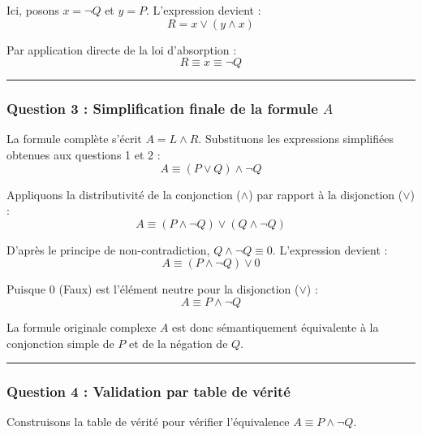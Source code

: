 \documentclass[11pt,a4paper]{article}
\begin{document}
Ici, posons \(x = \neg Q\) et \(y = P\). L'expression devient :
\[R = x \lor (y \land x)\]

Par application directe de la loi d'absorption :
\[R \equiv x \equiv \neg Q\]

\begin{center}\rule{0.5\linewidth}{0.5pt}\end{center}

\hypertarget{question-3-simplification-finale-de-la-formule-a}{%
\subsubsection{\texorpdfstring{Question 3 : Simplification finale de la
formule
\(A\)}{Question 3 : Simplification finale de la formule A}}\label{question-3-simplification-finale-de-la-formule-a}}

La formule complète s'écrit \(A = L \land R\). Substituons les
expressions simplifiées obtenues aux questions 1 et 2 :
\[A \equiv (P \lor Q) \land \neg Q\]

Appliquons la distributivité de la conjonction (\(\land\)) par rapport à
la disjonction (\(\lor\)) :
\[A \equiv (P \land \neg Q) \lor (Q \land \neg Q)\]

D'après le principe de non-contradiction, \(Q \land \neg Q \equiv 0\).
L'expression devient : \[A \equiv (P \land \neg Q) \lor 0\]

Puisque \(0\) (Faux) est l'élément neutre pour la disjonction (\(\lor\))
: \[A \equiv P \land \neg Q\]

La formule originale complexe \(A\) est donc sémantiquement équivalente
à la conjonction simple de \(P\) et de la négation de \(Q\).

\begin{center}\rule{0.5\linewidth}{0.5pt}\end{center}

\hypertarget{question-4-validation-par-table-de-vuxe9rituxe9}{%
\subsubsection{Question 4 : Validation par table de
vérité}\label{question-4-validation-par-table-de-vuxe9rituxe9}}

Construisons la table de vérité pour vérifier l'équivalence
\(A \equiv P \land \neg Q\).
\end{document}
